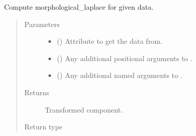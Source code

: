 \documentclass[letterpaper,10pt,english]{sphinxmanual}
\begin{document}
\begin{fulllineitems}
\begin{fulllineitems}
\label{\detokenize{api/rock:geology.src.Rock.morphological_laplace}}
Compute morphological\_laplace for given data.
\begin{quote}\begin{description}
\item[{Parameters}] \leavevmode\begin{itemize}
\item {} 
 (\sphinxstyleliteralemphasis{\sphinxupquote{, }}) \textendash{} Attribute to get the data from.

\item {} 
 () \textendash{} Any additional positional arguments to .

\item {} 
 () \textendash{} Any additional named arguments to .

\end{itemize}

\item[{Returns}] \leavevmode
{} \textendash{} Transformed component.

\item[{Return type}] \leavevmode
{\hyperref[\detokenize{api/base_classes:geology.src.base_spatial.SpatialComponent}]{}}

\end{description}\end{quote}

\end{fulllineitems}



\end{fulllineitems}
\end{document}
